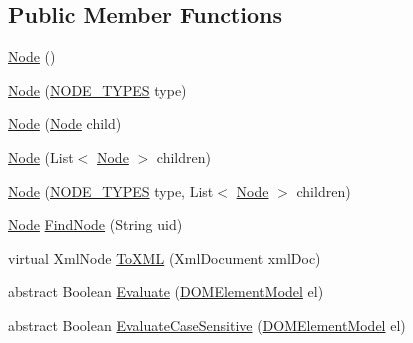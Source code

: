 \subsection*{Public Member Functions}
\begin{DoxyCompactItemize}
\item 
\hyperlink{class_web_analyzer_1_1_models_1_1_settings_model_1_1_expression_tree_1_1_node_af25a40f1b18460d7bee03021e19335fb}{Node} ()
\item 
\hyperlink{class_web_analyzer_1_1_models_1_1_settings_model_1_1_expression_tree_1_1_node_a10c868b90b509e4355a2d9c9b7b34968}{Node} (\hyperlink{class_web_analyzer_1_1_models_1_1_settings_model_1_1_expression_tree_1_1_node_a89c72b19ff778cbc04788f4cb47a730e}{N\+O\+D\+E\+\_\+\+T\+Y\+P\+E\+S} type)
\item 
\hyperlink{class_web_analyzer_1_1_models_1_1_settings_model_1_1_expression_tree_1_1_node_a5ac174eb5648c594f80c5ca3e74a6687}{Node} (\hyperlink{class_web_analyzer_1_1_models_1_1_settings_model_1_1_expression_tree_1_1_node}{Node} child)
\item 
\hyperlink{class_web_analyzer_1_1_models_1_1_settings_model_1_1_expression_tree_1_1_node_a8f431fec0565dbc38cf63b8c469ff9b6}{Node} (List$<$ \hyperlink{class_web_analyzer_1_1_models_1_1_settings_model_1_1_expression_tree_1_1_node}{Node} $>$ children)
\item 
\hyperlink{class_web_analyzer_1_1_models_1_1_settings_model_1_1_expression_tree_1_1_node_a499c9647efddf11d1fe3bd3c8759e5d3}{Node} (\hyperlink{class_web_analyzer_1_1_models_1_1_settings_model_1_1_expression_tree_1_1_node_a89c72b19ff778cbc04788f4cb47a730e}{N\+O\+D\+E\+\_\+\+T\+Y\+P\+E\+S} type, List$<$ \hyperlink{class_web_analyzer_1_1_models_1_1_settings_model_1_1_expression_tree_1_1_node}{Node} $>$ children)
\item 
\hyperlink{class_web_analyzer_1_1_models_1_1_settings_model_1_1_expression_tree_1_1_node}{Node} \hyperlink{class_web_analyzer_1_1_models_1_1_settings_model_1_1_expression_tree_1_1_node_a603b5439f3109a1d8718bb2a879c36b9}{Find\+Node} (String uid)
\item 
virtual Xml\+Node \hyperlink{class_web_analyzer_1_1_models_1_1_settings_model_1_1_expression_tree_1_1_node_afd5fd3184ae6075feac0012977e349b6}{To\+X\+M\+L} (Xml\+Document xml\+Doc)
\item 
abstract Boolean \hyperlink{class_web_analyzer_1_1_models_1_1_settings_model_1_1_expression_tree_1_1_node_aa07f08b4a2299c2b9752a1eba59e245d}{Evaluate} (\hyperlink{class_web_analyzer_1_1_models_1_1_data_model_1_1_d_o_m_element_model}{D\+O\+M\+Element\+Model} el)
\item 
abstract Boolean \hyperlink{class_web_analyzer_1_1_models_1_1_settings_model_1_1_expression_tree_1_1_node_a5cf0b866812c017ef1d0feb5f594499e}{Evaluate\+Case\+Sensitive} (\hyperlink{class_web_analyzer_1_1_models_1_1_data_model_1_1_d_o_m_element_model}{D\+O\+M\+Element\+Model} el)
\end{DoxyCompactItemize}
